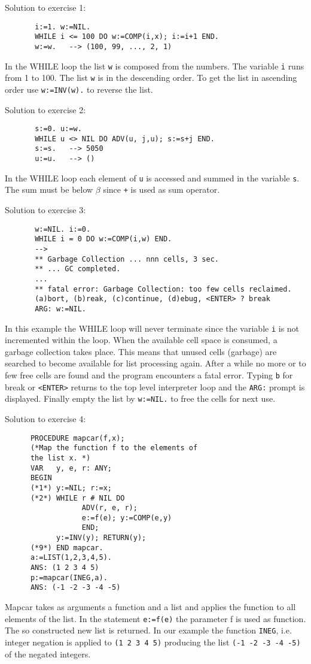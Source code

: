 Solution to exercise 1:
\begin{verbatim}
       i:=1. w:=NIL.
       WHILE i <= 100 DO w:=COMP(i,x); i:=i+1 END.
       w:=w.   --> (100, 99, ..., 2, 1)
\end{verbatim}
In the WHILE loop the list \verb/w/ is composed from the 
numbers. The variable \verb/i/ runs from 1 to 100.
The list \verb/w/ is in the descending order. To get the list
in ascending order use \verb/w:=INV(w)./ to reverse the list.

Solution to exercise 2:
\begin{verbatim}
       s:=0. u:=w.
       WHILE u <> NIL DO ADV(u, j,u); s:=s+j END.
       s:=s.   --> 5050
       u:=u.   --> ()
\end{verbatim}
In the WHILE loop each element of \verb/u/ is accessed and
summed in the variable \verb/s/. The sum must be below $\beta$
since \verb/+/ is used as sum operator.

Solution to exercise 3:
\begin{verbatim}
       w:=NIL. i:=0.
       WHILE i = 0 DO w:=COMP(i,w) END.
       --> 
       ** Garbage Collection ... nnn cells, 3 sec.
       ** ... GC completed.
       ...
       ** fatal error: Garbage Collection: too few cells reclaimed.
       (a)bort, (b)reak, (c)continue, (d)ebug, <ENTER> ? break
       ARG: w:=NIL.
\end{verbatim}
In this example the WHILE loop will never terminate
since the variable \verb/i/ is not incremented within the
loop. When the available cell space is consumed, a 
garbage collection takes place. This means that unused
cells (garbage) are searched to become available for
list processing again.
After a while no more or to few free cells are found
and the program encounters a fatal error.
Typing \verb/b/ for break or \verb/<ENTER>/ returns to the 
top level interpreter loop and the \verb/ARG:/ prompt
is displayed. Finally empty the list by \verb/w:=NIL./ to
free the cells for next use.

Solution to exercise 4:
\begin{verbatim}
      PROCEDURE mapcar(f,x);
      (*Map the function f to the elements of 
      the list x. *)
      VAR   y, e, r: ANY;
      BEGIN 
      (*1*) y:=NIL; r:=x;
      (*2*) WHILE r # NIL DO 
                  ADV(r, e, r);
                  e:=f(e); y:=COMP(e,y)
                  END; 
            y:=INV(y); RETURN(y);
      (*9*) END mapcar.
      a:=LIST(1,2,3,4,5).
      ANS: (1 2 3 4 5)
      p:=mapcar(INEG,a).
      ANS: (-1 -2 -3 -4 -5)
\end{verbatim}
Mapcar takes as arguments a function and a list  and applies
the function to all elements of the list. 
In the statement \verb/e:=f(e)/ the parameter f is used as function. 
The so constructed new list is returned. 
In our example the function 
\verb/INEG/, i.e. integer negation is applied to 
\verb/(1 2 3 4 5)/ producing the list  
\verb/(-1 -2 -3 -4 -5)/ of the negated integers. 


